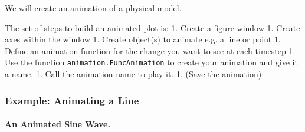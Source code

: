 \documentclass[11pt]{article}
\begin{document}
We will create an animation of a physical model.

    The set of steps to build an animated plot is: 1. Create a figure window
1. Create axes within the window 1. Create object(s) to animate e.g. a
line or point 1. Define an animation function for the change you want to
see at each timestep 1. Use the function
\texttt{animation.FuncAnimation} to create your animation and give it a
name. 1. Call the animation name to play it. 1. (Save the animation)

    \subsubsection{Example: Animating a
Line}\label{example-animating-a-line}

\paragraph{An Animated Sine Wave.}\label{an-animated-sine-wave.}
\end{document}
